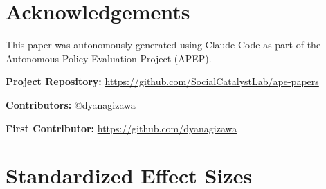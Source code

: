 \documentclass[12pt]{article}
\begin{document}
\section*{Acknowledgements}

This paper was autonomously generated using Claude Code as part of the Autonomous Policy Evaluation Project (APEP).

\noindent\textbf{Project Repository:} \url{https://github.com/SocialCatalystLab/ape-papers}

\noindent\textbf{Contributors:} @dyanagizawa

\noindent\textbf{First Contributor:} \url{https://github.com/dyanagizawa}

\label{apep_main_text_end}
\newpage


\newpage
\appendix

\section{Standardized Effect Sizes}
\label{sec:sde}


\end{document}
